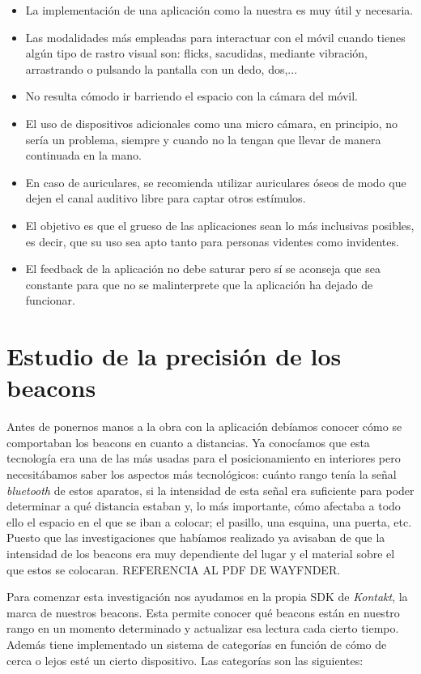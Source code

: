 \begin{itemize}
	\item La implementación de una aplicación como la nuestra es muy útil y necesaria.
	\item Las modalidades más empleadas para interactuar con el móvil cuando tienes algún tipo de rastro visual son: flicks, sacudidas, mediante vibración, arrastrando o pulsando la pantalla con un dedo, dos,...
	\item No resulta cómodo ir barriendo el espacio con la cámara del móvil.
	\item El uso de dispositivos adicionales como una micro cámara, en principio, no sería un problema, siempre y cuando no la tengan que llevar de manera continuada en la mano.
	\item En caso de auriculares, se recomienda utilizar auriculares óseos de modo que dejen el canal auditivo libre para captar otros estímulos.
	\item El objetivo es que el grueso de las aplicaciones sean lo más inclusivas posibles, es decir, que su uso sea apto tanto para personas videntes como invidentes.
	\item El feedback de la aplicación no debe saturar pero sí se aconseja que sea constante para que no se malinterprete que la aplicación ha dejado de funcionar.
\end{itemize}


\section{Estudio de la precisión de los beacons}

Antes de ponernos manos a la obra con la aplicación debíamos conocer cómo se comportaban los beacons en cuanto a distancias. Ya conocíamos que esta tecnología era una de las más usadas para el posicionamiento en interiores pero necesitábamos saber los aspectos más tecnológicos: cuánto rango tenía la señal \textit{bluetooth} de estos aparatos, si la intensidad de esta señal era suficiente para poder determinar a qué distancia estaban y, lo más importante, cómo afectaba a todo ello el espacio en el que se iban a colocar; el pasillo, una esquina, una puerta, etc. Puesto que las investigaciones que habíamos realizado ya avisaban de que la intensidad de los beacons era muy dependiente del lugar y el material sobre el que estos se colocaran. REFERENCIA AL PDF DE WAYFNDER.

Para comenzar esta investigación nos ayudamos en la propia SDK de \textit{Kontakt}, la marca de nuestros beacons. Esta permite conocer qué beacons están en nuestro rango en un momento determinado y actualizar esa lectura cada cierto tiempo. Además tiene implementado un sistema de categorías en función de cómo de cerca o lejos esté un cierto dispositivo. Las categorías son las siguientes:

